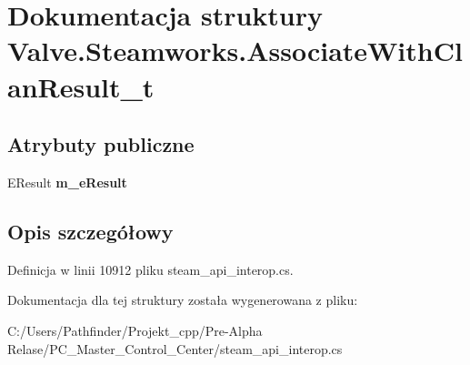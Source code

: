 \hypertarget{struct_valve_1_1_steamworks_1_1_associate_with_clan_result__t}{}\section{Dokumentacja struktury Valve.\+Steamworks.\+Associate\+With\+Clan\+Result\+\_\+t}
\label{struct_valve_1_1_steamworks_1_1_associate_with_clan_result__t}
\subsection*{Atrybuty publiczne}
\begin{DoxyCompactItemize}
\item 
\mbox{\label{struct_valve_1_1_steamworks_1_1_associate_with_clan_result__t_a1e99a417a16798b3c75439f5f7d2ecc7}} 
E\+Result {\bfseries m\+\_\+e\+Result}
\end{DoxyCompactItemize}


\subsection{Opis szczegółowy}


Definicja w linii 10912 pliku steam\+\_\+api\+\_\+interop.\+cs.



Dokumentacja dla tej struktury została wygenerowana z pliku\+:\begin{DoxyCompactItemize}
\item 
C\+:/\+Users/\+Pathfinder/\+Projekt\+\_\+cpp/\+Pre-\/\+Alpha Relase/\+P\+C\+\_\+\+Master\+\_\+\+Control\+\_\+\+Center/steam\+\_\+api\+\_\+interop.\+cs\end{DoxyCompactItemize}

